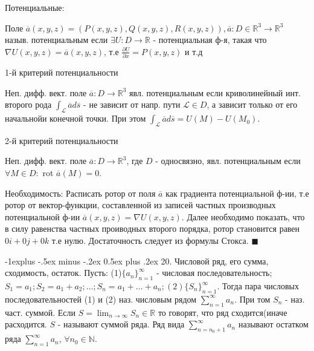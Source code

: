\documentclass[unicode,10pt, landscape]{article}
\makeatletter
\renewcommand{\subsection}{\@startsection{subsection}{2}{0mm}%
                                {-1explus -.5ex minus -.2ex}%
                                {0.5ex plus .2ex}%
                                {\normalfont\normalsize\bfseries}}
\newenvironment{Proof} %
{\par\noindent{\bf Док-во:}} %
{\hfill$\scriptstyle\blacksquare$}
\makeatother
\begin{document}
\begin{multicols}{2}
Потенциальные:
\begin{Def}
Поле $\overline{a}(x, y, z) = (P(x, y, z), Q(x, y, z), R(x, y, z)), \overline{a} : D \in \mathbb{R}^3 \to \mathbb{R}^3$ назыв. потенциальным если $\exists U: D \to \mathbb{R}$ - потенциальная ф-я, такая что $\nabla U(x, y, z) = \overline{a}(x, y, z)$, т.е $\frac{\partial U}{\partial x} = P(x, y, z)$ и т.д
\end{Def}
1-й критерий потенциальности
\begin{Th}
Неп. дифф. вект. поле $\overline{a}: D \to \mathbb{R}^3$ явл. потенциальным если криволинейный инт. второго рода $\int_{\mathcal{L}}\overline{a}d\overline{s}$ - не зависит от напр. пути $\mathcal{L} \in D$, а зависит только от его начальнойи конечной точки. При этом $\int_{\mathcal{L}}\overline{a}d\overline{s} = U(M) - U(M_0)$.
\end{Th}
2-й критерий потенциальности
\begin{Th}
Неп. дифф. вект. поле $\overline{a}: D \to \mathbb{R}^3$, где $D$ - односвязно, явл. потенциальным если $\forall M \in D: $ rot $\overline{a}(M) = 0$.
\begin{Proof}
Необходимость: Расписать ротор от поля $\overline{a}$ как градиента потенциальной ф-ии, т.е ротор от вектор-функции, составленной из записей частных производных потенциальной ф-ии $\overline{a}(x, y, z) = \nabla U(x, y, z)$. Далее необходимо показать, что в силу равенства частных проиводных второго порядка, ротор становится равен $0i + 0j + 0k$ т.е нулю.
Достаточность следует из формулы Стокса.
\end{Proof}
\end{Th}


\subsection{20. Числовой ряд, его сумма, сходимость, остаток.}
Пусть: (1)$\{a_n\}_{n = 1}^\infty$ - числовая последовательность; $S_1 = a_1; S_2 = a_1+a_2; \ldots; S_n = a_1 + \ldots + a_n; (2) \{S_n\}_{n=1}^\infty$. Тогда пара числовых последовательностей (1) и (2) наз. числовым рядом $\sum_{n=1}^\infty a_n$. При том $S_n$ - наз. част. суммой. Если $S = \lim_{n \to \infty}S_n \in \mathbb{R}$ то говорят, что ряд сходится(иначе расходится. $S$ - называют суммой ряда. Ряд вида $\sum_{n = n_0 + 1}^\infty a_n$ называют остатком ряда $\sum_{n=1}^\infty a_n$, $\forall n_0 \in \mathbb{N}$.



\end{multicols}
\end{document}
